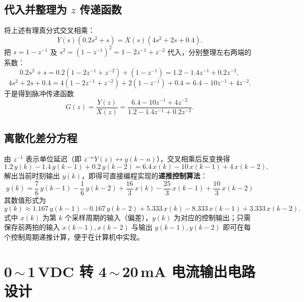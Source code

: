 \documentclass[12pt,a4paper]{ctexart}
\begin{document}
\subsection{代入并整理为 $z$ 传递函数}
将上述有理真分式交叉相乘：
\begin{equation}
Y(s)\left(0.2s^{2}+s\right)=X(s)\left(4s^{2}+2s+0.4\right).
\end{equation}
把 $s=1-z^{-1}$ 及 $s^{2}=(1-z^{-1})^{2}=1-2z^{-1}+z^{-2}$ 代入，分别整理左右两端的系数：
\begin{equation}
0.2s^{2}+s = 0.2\left(1-2z^{-1}+z^{-2}\right)+\left(1-z^{-1}\right)
            = 1.2-1.4z^{-1}+0.2z^{-2},
\end{equation}
\begin{equation}
4s^{2}+2s+0.4 = 4\left(1-2z^{-1}+z^{-2}\right)+2\left(1-z^{-1}\right)+0.4
            = 6.4-10z^{-1}+4z^{-2}.
\end{equation}
于是得到脉冲传递函数
\begin{equation}
G(z)=\frac{Y(z)}{X(z)}=\frac{6.4-10z^{-1}+4z^{-2}}{1.2-1.4z^{-1}+0.2z^{-2}}.
\end{equation}

\subsection{离散化差分方程}
由 $z^{-1}$ 表示单位延迟（即 $z^{-n}Y(z)\leftrightarrow y(k-n)$），交叉相乘后反变换得
\begin{equation}
1.2\,y(k)-1.4\,y(k-1)+0.2\,y(k-2)=6.4\,x(k)-10\,x(k-1)+4\,x(k-2).
\end{equation}
解出当前时刻输出 $y(k)$，即得可直接编程实现的\textbf{递推控制算法}：
\begin{equation}
\boxed{\;
y(k)=\frac{7}{6}\,y(k-1)-\frac{1}{6}\,y(k-2)
      +\frac{16}{3}\,x(k)-\frac{25}{3}\,x(k-1)+\frac{10}{3}\,x(k-2)\;}
\end{equation}
其数值形式为
\begin{equation}
y(k)\approx 1.167\,y(k-1)-0.167\,y(k-2)
      +5.333\,x(k)-8.333\,x(k-1)+3.333\,x(k-2).
\end{equation}
式中 $x(k)$ 为第 $k$ 个采样周期的输入（偏差），$y(k)$ 为对应的控制输出；只需保存前两拍的输入
$x(k-1),x(k-2)$ 与输出 $y(k-1),y(k-2)$ 即可在每个控制周期递推计算，便于在计算机中实现。

\section{0\,$\sim$\,1\,VDC 转 4\,$\sim$\,20\,mA 电流输出电路设计}
\end{document}
